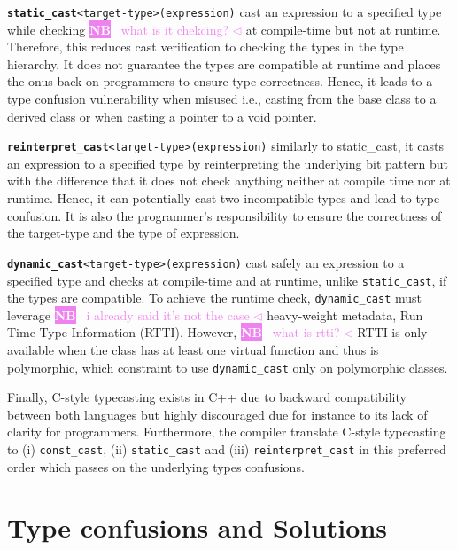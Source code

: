 \documentclass[a4paper,11pt,oneside]{report}
\newcommand{\todobox}[3]{%
       \colorbox{#1}{\textcolor{white}{\sffamily\bfseries\scriptsize #2}}%
       ~\textcolor{#1}{#3} %
       \textcolor{#1}{$\triangleleft$}%
}
\newcommand{\nb}[1]{\todobox{violet}{NB}{#1}}
\begin{document}
\texttt{\textbf{static\_cast}<target-type>(expression)} cast an expression to a
specified type while checking \nb{what is it chekcing?} at compile-time but not at runtime. Therefore, this
reduces cast verification to checking the types in the type hierarchy. It does
not guarantee the types are compatible at runtime and places the onus back on
programmers to ensure type correctness. Hence, it leads to a type confusion
vulnerability when misused i.e., casting from the base class to a derived class
or when casting a pointer to a void pointer.

\texttt{\textbf{reinterpret\_cast}<target-type>(expression)} similarly to
static\_cast, it casts an expression to a specified type by reinterpreting the
underlying bit pattern but with the difference that it does not check anything neither at
compile time nor at runtime. Hence, it can potentially cast two incompatible
types and lead to type confusion.  It is also the programmer's responsibility to
ensure the correctness of the target-type and the type of expression.

\texttt{\textbf{dynamic\_cast}<target-type>(expression)} cast safely an
expression to a specified type and checks at compile-time and at runtime, unlike
\texttt{static\_cast}, if the types are compatible.  To achieve the runtime
check, \texttt{dynamic\_cast} must leverage \nb{i already said it's not the case}heavy-weight metadata, Run Time Type
Information (RTTI). However, \nb{what is rtti?}RTTI is only available when the class has at least
one virtual function and thus is polymorphic, which constraint to use
\texttt{dynamic\_cast} only on polymorphic classes.

Finally, C-style typecasting exists in C++ due to backward compatibility between
both languages but highly discouraged due for instance to its lack of clarity
for programmers.  Furthermore, the compiler translate C-style typecasting to (i)
\texttt{const\_cast}, (ii) \texttt{static\_cast} and (iii)
\texttt{reinterpret\_cast} in this preferred order which passes on the
underlying types confusions.

\section{Type confusions and Solutions} \label{sec:cpp_solutions}
\end{document}
